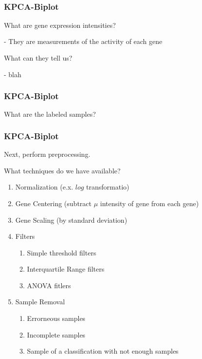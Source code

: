 \documentclass[serif ]{beamer}
\begin{document}
\begin{frame}
\begin{equation}
\begin{matrix}
			\end{matrix}
			\end{equation}

	

	\end{frame}

	\begin{frame}
		\frametitle{KPCA-Biplot}
			What are gene expression intensities? \newline
			
			- They are measurements of the activity of each gene\newline

			What can they tell us?\newline
			
			- blah
	\end{frame}

	\begin{frame}
		\frametitle{KPCA-Biplot}
		What are the labeled samples?
	\end{frame}


	\begin{frame}
		\frametitle{KPCA-Biplot}
		Next, perform preprocessing. \newline

		What techniques do we have available?
			\begin{enumerate}
				\item Normalization (e.x. $log$ transformatio)
				\item Gene Centering (subtract $\mu$ intensity of gene from each gene)
				\item Gene Scaling (by standard deviation)
				\item Filters
					\begin{enumerate}
						\item Simple threshold filters
						\item Interquartile Range filters
						\item ANOVA fitlers
					\end{enumerate}
				\item Sample Removal
					\begin{enumerate}
						\item Errorneous samples
						\item Incomplete samples
						\item Sample of a classification with not enough samples
					\end{enumerate}
			\end{enumerate}		

	\end{frame}
\end{document}
